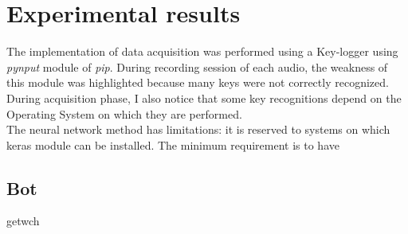 \chapter{Experimental results}
The implementation of data acquisition was performed using a Key-logger using \textit{pynput} module of \textit{pip}. During recording session of each audio, the weakness of this module was highlighted because many keys were not correctly recognized. During acquisition phase, I also notice that some key recognitions depend on the Operating System on which they are performed.\\
The neural network method has limitations: it is reserved to systems on which keras module can be installed. The minimum requirement is to have 

\section{Bot}
getwch